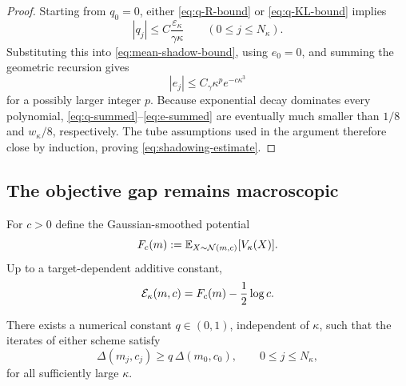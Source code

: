 \begin{proof}
Starting from $q_0=0$, either \eqref{eq:q-R-bound} or \eqref{eq:q-KL-bound} implies
\begin{equation}
\label{eq:q-summed}
    |q_j|
    \leq
    C\frac{\varepsilon_\kappa}{\gamma\kappa}
    \qquad
    (0\leq j\leq N_\kappa).
\end{equation}
Substituting this into \eqref{eq:mean-shadow-bound}, using $e_0=0$, and summing the
geometric recursion gives
\begin{equation}
\label{eq:e-summed}
    |e_j|
    \leq
    C_\gamma\kappa^p e^{-c\kappa^3}
\end{equation}
for a possibly larger integer $p$.  Because exponential decay dominates every polynomial,
\eqref{eq:q-summed}--\eqref{eq:e-summed} are eventually much smaller than $1/8$ and
$w_\kappa/8$, respectively.  The tube assumptions used in the argument therefore close by
induction, proving \eqref{eq:shadowing-estimate}.
\end{proof}

\subsection{The objective gap remains macroscopic}

For $c>0$ define the Gaussian-smoothed potential
\begin{equation}
\label{eq:Fc}
    F_c(m):=\mathbb{E}_{X\sim\mathcal{N}(m,c)}[V_\kappa(X)].
\end{equation}
Up to a target-dependent additive constant,
\begin{equation}
\label{eq:scalar-objective}
    \mathcal{E}_\kappa(m,c)=F_c(m)-\frac12\log c.
\end{equation}

\begin{lemma}
\label{lem:disc-objective-gap}
There exists a numerical constant $q\in(0,1)$, independent of $\kappa$, such that the
iterates of either scheme satisfy
\begin{equation}
\label{eq:disc-gap-lower-all}
    \Delta(m_j,c_j)\geq q\,\Delta(m_0,c_0),
    \qquad
    0\leq j\leq N_\kappa,
\end{equation}
for all sufficiently large $\kappa$.
\end{lemma}

